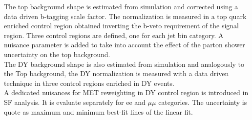 The top background shape is estimated from simulation and corrected using a data driven b-tagging scale factor. The normalization is measured in a top quark enriched control region obtained inverting the b-veto requirement of the signal region. Three control regions are defined, one for each jet bin category. 
A nuisance parameter is added to take into account the effect of the parton shower uncertainty on the top background. \\
The DY background shape is also estimated from simulation and analogously to the Top background, the DY normalization is measured with a data driven technique in three control regions enriched in DY events.\\
A dedicated nuisances for MET reweighting in DY control region is introduced in SF analysis. It is evaluate separately for ee and $\mu \mu$ categories. 
The uncertainty is quote as maximum and minimum best-fit lines of the linear fit.

